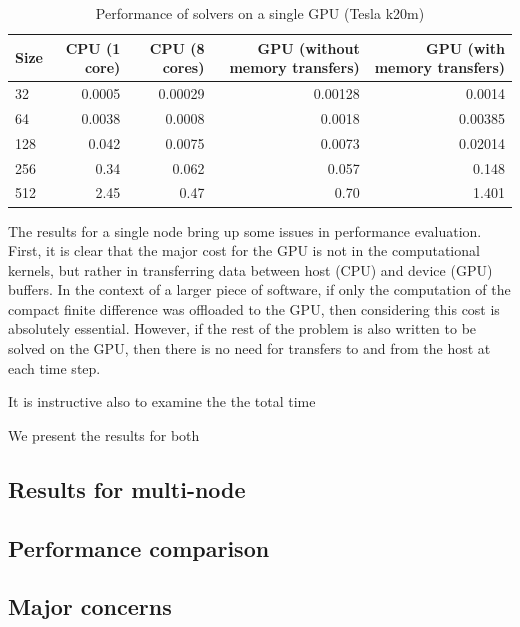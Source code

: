 \documentclass{article}
\begin{document}
    \begin{table}
    \centering
    \begin{tabular}{|l|r|r|r|r|}
    \hline
    Size    &      CPU (1 core) &  CPU (8 cores) & GPU (without memory transfers)  & GPU (with memory transfers) \\
    \hline
    32      &     0.0005        &   0.00029     &   0.00128 &   0.0014   \\
    64      &     0.0038        &   0.0008      &   0.0018  &   0.00385  \\
    128     &     0.042         &   0.0075      &   0.0073  &   0.02014  \\
    256     &     0.34          &   0.062       &   0.057   &   0.148    \\
    512     &     2.45          &   0.47        &   0.70    &   1.401    \\
    \hline
    \end{tabular}
    \caption{Performance of solvers on a single GPU (Tesla k20m)}
    \label{table:res1}
    \end{table}

    The results for a single node bring up some issues in performance evaluation.
    First, it is clear that the major cost for the GPU is not in the computational
    kernels, but rather in transferring data between host (CPU) and device (GPU) buffers.
    In the context of a larger piece of software,
    if only the computation of the compact finite difference was offloaded
    to the GPU, then considering this cost is absolutely essential.
    However, if the rest of the problem is also written to be solved on the GPU,
    then there is no need for transfers to and from the host at each
    time step.

    It is instructive also to examine the the total time


    We present the results for both

    \subsection{Results for multi-node}



    \subsection{Performance comparison}

    \subsection{Major concerns}
\end{document}
